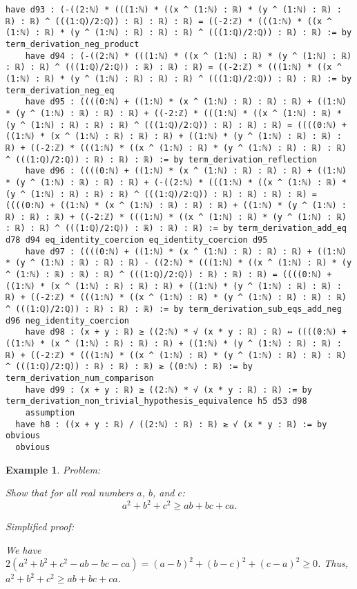 \documentclass{article}
\newtheorem{example}{Example}
\begin{document}
\begin{tcolorbox}[colback=white!10, width=\linewidth]
\begin{lstlisting}[language=Lean4]
    have d93 : (-((2:ℕ) * (((1:ℕ) * ((x ^ (1:ℕ) : ℝ) * (y ^ (1:ℕ) : ℝ) : ℝ) : ℝ) ^ (((1:ℚ)/2:ℚ)) : ℝ) : ℝ) : ℝ) = ((-2:ℤ) * (((1:ℕ) * ((x ^ (1:ℕ) : ℝ) * (y ^ (1:ℕ) : ℝ) : ℝ) : ℝ) ^ (((1:ℚ)/2:ℚ)) : ℝ) : ℝ) := by term_derivation_neg_product
    have d94 : (-((2:ℕ) * (((1:ℕ) * ((x ^ (1:ℕ) : ℝ) * (y ^ (1:ℕ) : ℝ) : ℝ) : ℝ) ^ (((1:ℚ)/2:ℚ)) : ℝ) : ℝ) : ℝ) = ((-2:ℤ) * (((1:ℕ) * ((x ^ (1:ℕ) : ℝ) * (y ^ (1:ℕ) : ℝ) : ℝ) : ℝ) ^ (((1:ℚ)/2:ℚ)) : ℝ) : ℝ) := by term_derivation_neg_eq
    have d95 : ((((0:ℕ) + ((1:ℕ) * (x ^ (1:ℕ) : ℝ) : ℝ) : ℝ) + ((1:ℕ) * (y ^ (1:ℕ) : ℝ) : ℝ) : ℝ) + ((-2:ℤ) * (((1:ℕ) * ((x ^ (1:ℕ) : ℝ) * (y ^ (1:ℕ) : ℝ) : ℝ) : ℝ) ^ (((1:ℚ)/2:ℚ)) : ℝ) : ℝ) : ℝ) = ((((0:ℕ) + ((1:ℕ) * (x ^ (1:ℕ) : ℝ) : ℝ) : ℝ) + ((1:ℕ) * (y ^ (1:ℕ) : ℝ) : ℝ) : ℝ) + ((-2:ℤ) * (((1:ℕ) * ((x ^ (1:ℕ) : ℝ) * (y ^ (1:ℕ) : ℝ) : ℝ) : ℝ) ^ (((1:ℚ)/2:ℚ)) : ℝ) : ℝ) : ℝ) := by term_derivation_reflection
    have d96 : ((((0:ℕ) + ((1:ℕ) * (x ^ (1:ℕ) : ℝ) : ℝ) : ℝ) + ((1:ℕ) * (y ^ (1:ℕ) : ℝ) : ℝ) : ℝ) + (-((2:ℕ) * (((1:ℕ) * ((x ^ (1:ℕ) : ℝ) * (y ^ (1:ℕ) : ℝ) : ℝ) : ℝ) ^ (((1:ℚ)/2:ℚ)) : ℝ) : ℝ) : ℝ) : ℝ) = ((((0:ℕ) + ((1:ℕ) * (x ^ (1:ℕ) : ℝ) : ℝ) : ℝ) + ((1:ℕ) * (y ^ (1:ℕ) : ℝ) : ℝ) : ℝ) + ((-2:ℤ) * (((1:ℕ) * ((x ^ (1:ℕ) : ℝ) * (y ^ (1:ℕ) : ℝ) : ℝ) : ℝ) ^ (((1:ℚ)/2:ℚ)) : ℝ) : ℝ) : ℝ) := by term_derivation_add_eq d78 d94 eq_identity_coercion eq_identity_coercion d95
    have d97 : ((((0:ℕ) + ((1:ℕ) * (x ^ (1:ℕ) : ℝ) : ℝ) : ℝ) + ((1:ℕ) * (y ^ (1:ℕ) : ℝ) : ℝ) : ℝ) - ((2:ℕ) * (((1:ℕ) * ((x ^ (1:ℕ) : ℝ) * (y ^ (1:ℕ) : ℝ) : ℝ) : ℝ) ^ (((1:ℚ)/2:ℚ)) : ℝ) : ℝ) : ℝ) = ((((0:ℕ) + ((1:ℕ) * (x ^ (1:ℕ) : ℝ) : ℝ) : ℝ) + ((1:ℕ) * (y ^ (1:ℕ) : ℝ) : ℝ) : ℝ) + ((-2:ℤ) * (((1:ℕ) * ((x ^ (1:ℕ) : ℝ) * (y ^ (1:ℕ) : ℝ) : ℝ) : ℝ) ^ (((1:ℚ)/2:ℚ)) : ℝ) : ℝ) : ℝ) := by term_derivation_sub_eqs_add_neg d96 neg_identity_coercion
    have d98 : (x + y : ℝ) ≥ ((2:ℕ) * √ (x * y : ℝ) : ℝ) ↔ ((((0:ℕ) + ((1:ℕ) * (x ^ (1:ℕ) : ℝ) : ℝ) : ℝ) + ((1:ℕ) * (y ^ (1:ℕ) : ℝ) : ℝ) : ℝ) + ((-2:ℤ) * (((1:ℕ) * ((x ^ (1:ℕ) : ℝ) * (y ^ (1:ℕ) : ℝ) : ℝ) : ℝ) ^ (((1:ℚ)/2:ℚ)) : ℝ) : ℝ) : ℝ) ≥ ((0:ℕ) : ℝ) := by term_derivation_num_comparison
    have d99 : (x + y : ℝ) ≥ ((2:ℕ) * √ (x * y : ℝ) : ℝ) := by term_derivation_non_trivial_hypothesis_equivalence h5 d53 d98
    assumption
  have h8 : ((x + y : ℝ) / ((2:ℕ) : ℝ) : ℝ) ≥ √ (x * y : ℝ) := by obvious
  obvious

\end{lstlisting}
\end{tcolorbox}


\begin{example}
Problem:
\begin{tcolorbox}[colback=yellow!10, width=\linewidth]
Show that for all real numbers $a$, $b$, and $c$:
    $$a^2 + b^2 + c^2 \geq ab + bc + ca.$$
\end{tcolorbox}

Simplified proof:
\begin{tcolorbox}[colback=blue!10, width=\linewidth]
We have $2(a^2 + b^2 + c^2 - ab - bc - ca) = (a-b)^2 + (b-c)^2 + (c-a)^2 \ge 0$. Thus, $a^2 + b^2 + c^2 \geq ab + bc + ca$.
\end{tcolorbox}
\end{example}
\end{document}
